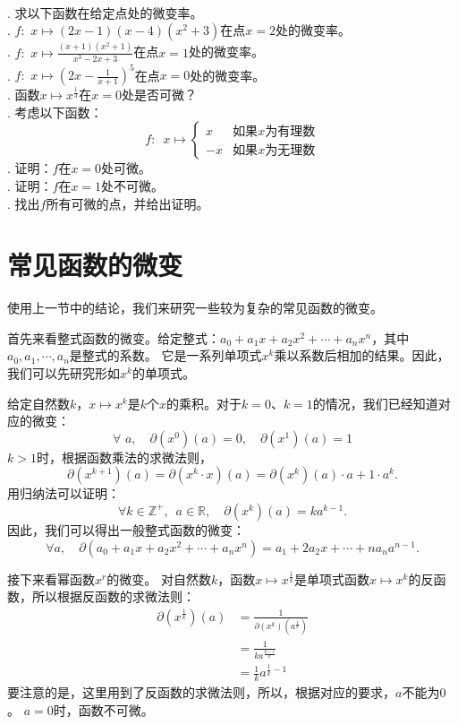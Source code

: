 \documentclass[12pt,UTF8]{ctexbook}
\begin{document}
\begin{xt}
    \mbox{} \\
    . 求以下函数在给定点处的微变率。\\
    . $f: \,\, x \mapsto (2x - 1)(x -4)(x^2 + 3)$在点$x = 2$处的微变率。\\
    . $f: \,\, x \mapsto \frac{(x + 1)(x^2 + 1)}{x^3 - 2x + 3}$在点$x = 1$处的微变率。\\
    . $f: \,\, x \mapsto (2x - \frac{1}{x + 1})^5$在点$x = 0$处的微变率。\\
    . 函数$x \mapsto x^{\frac{1}{3}}$在$x = 0$处是否可微？\\
    . 考虑以下函数：
    $$ f: \,\,\, x\mapsto \left\{
        \begin{array}{cl}
            x & \mbox{如果}x\mbox{为有理数} \\
            -x & \mbox{如果}x\mbox{为无理数} 
        \end{array}\right.
    $$
    . 证明：$f$在$x = 0$处可微。\\
    . 证明：$f$在$x = 1$处不可微。\\
    . 找出$f$所有可微的点，并给出证明。
\end{xt}

\section{常见函数的微变}

使用上一节中的结论，我们来研究一些较为复杂的常见函数的微变。

首先来看整式函数的微变。给定整式：$a_0 + a_1 x + a_2 x^2 + \cdots + a_n x^n$，其中$a_0, a_1, \cdots , a_n$是整式的系数。
它是一系列单项式$x^k$乘以系数后相加的结果。因此，我们可以先研究形如$x^k$的单项式。

给定自然数$k$，$x\mapsto x^k$是$k$个$x$的乘积。对于$k=0$、$k=1$的情况，我们已经知道对应的微变：
$$ \forall \,\, a, \quad \partial (x^0) (a) = 0, \quad \partial (x^1) (a) = 1 $$
$k > 1$时，根据函数乘法的求微法则，
$$ \partial (x^{k+1}) (a) = \partial (x^{k} \cdot x) (a) = \partial (x^k) (a) \cdot a + 1 \cdot a^k. $$
用归纳法可以证明：
$$ \forall k \in \mathbb{Z}^+, \,\,\, a\in \mathbb{R}, \quad \partial (x^k) (a) = k a^{k-1}. $$
因此，我们可以得出一般整式函数的微变：
$$ \forall a, \quad \partial (a_0 + a_1 x + a_2 x^2 + \cdots + a_n x^n) = a_1 + 2 a_2 x + \cdots + n a_n a^{n-1}. $$

接下来看幂函数$x^r$的微变。
对自然数$k$，函数$x \mapsto x^{\frac{1}{k}}$是单项式函数$x\mapsto x^k$的反函数，所以根据反函数的求微法则：
\begin{align*}
    \partial (x^{\frac{1}{k}}) (a) &= \frac{1}{\partial (x^k) (a^{\frac{1}{k}})}  \\
    &= \frac{1}{k a^{\frac{k-1}{k}}}  \\
    &= \frac{1}{k} a^{\frac{1}{k} - 1} 
\end{align*}
要注意的是，这里用到了反函数的求微法则，所以，根据对应的要求，$a$不能为$0$。
$a = 0$时，函数不可微。
\end{document}
